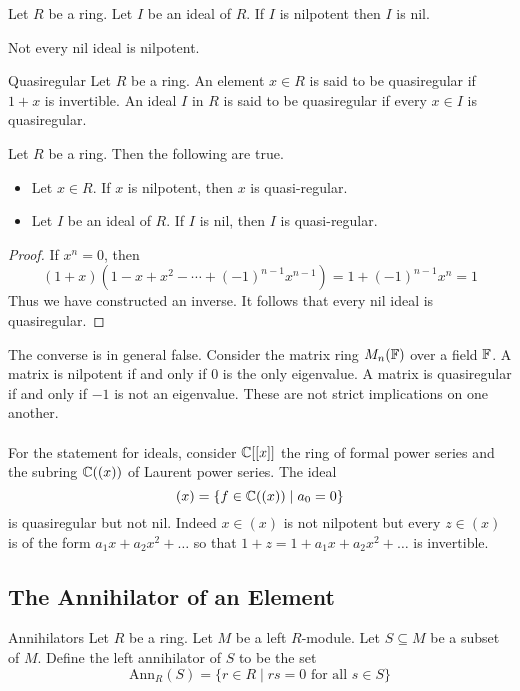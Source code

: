 \documentclass[a4paper]{article}
\begin{document}
\begin{lmm}{}{} Let $R$ be a ring. Let $I$ be an ideal of $R$. If $I$ is nilpotent then $I$ is nil. 
\end{lmm}

Not every nil ideal is nilpotent. 

\begin{defn}{Quasiregular}{} Let $R$ be a ring. An element $x\in R$ is said to be quasiregular if $1+x$ is invertible. An ideal $I$ in $R$ is said to be quasiregular if every $x\in I$ is quasiregular. 
\end{defn}

\begin{lmm}{}{} Let $R$ be a ring. Then the following are true. 
\begin{itemize}
\item Let $x\in R$. If $x$ is nilpotent, then $x$ is quasi-regular. 
\item Let $I$ be an ideal of $R$. If $I$ is nil, then $I$ is quasi-regular. 
\end{itemize}
\begin{proof}
If $x^n=0$, then $$(1+x)(1-x+x^2-\cdots+(-1)^{n-1}x^{n-1})=1+(-1)^{n-1}x^n=1$$ Thus we have constructed an inverse. It follows that every nil ideal is quasiregular. 
\end{proof}
\end{lmm}

The converse is in general false. Consider the matrix ring $M_n(\mathbb{F})$ over a field $\mathbb{F}$. A matrix is nilpotent if and only if $0$ is the only eigenvalue. A matrix is quasiregular if and only if $-1$ is not an eigenvalue. These are not strict implications on one another. \\~\\

For the statement for ideals, consider $\mathbb{C}[[x]]$ the ring of formal power series and the subring $\mathbb{C}((x))$ of Laurent power series. The ideal $$(x)=\{f\in\mathbb{C}((x))\;|\;a_0=0\}$$ is quasiregular but not nil. Indeed $x\in(x)$ is not nilpotent but every $z\in(x)$ is of the form $a_1x+a_2x^2+\dots$ so that $1+z=1+a_1x+a_2x^2+\dots$ is invertible. 

\subsection{The Annihilator of an Element}
\begin{defn}{Annihilators}{} Let $R$ be a ring. Let $M$ be a left $R$-module. Let $S\subseteq M$ be a subset of $M$. Define the left annihilator of $S$ to be the set $$\text{Ann}_R(S)=\{r\in R\;|\;rs=0\text{ for all }s\in S\}$$
\end{defn}
\end{document}
